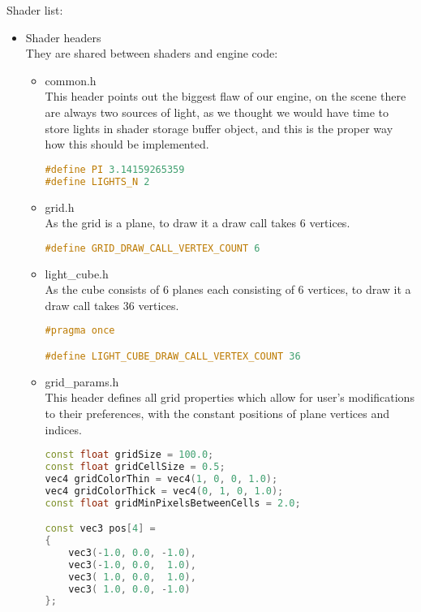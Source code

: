 Shader list:
\begin{itemize}
    \item Shader headers\\
    They are shared between shaders and engine code:
    \begin{itemize}
        \item common.h\\
        This header points out the biggest flaw of our engine, on the scene there are always two sources of light, as we thought we would have time to store lights in shader storage buffer object, and this is the proper way how this should be implemented.
\begin{lstlisting}[language=c++, caption=Common used shader constants (./assets/shaders/common.h)]
#define PI 3.14159265359
#define LIGHTS_N 2
\end{lstlisting}
    \item grid.h\\
    As the grid is a plane, to draw it a draw call takes 6 vertices.
\begin{lstlisting}[language=c++, caption=Grid constant (./assets/shaders/grid.h)]
#define GRID_DRAW_CALL_VERTEX_COUNT 6
\end{lstlisting}
    \item light\_cube.h\\
    As the cube consists of 6 planes each consisting of 6 vertices, to draw it a draw call takes 36 vertices.
\begin{lstlisting}[language=c++, caption=Light cubes shader constant (./assets/shaders/light\_cube.h)]
#pragma once

#define LIGHT_CUBE_DRAW_CALL_VERTEX_COUNT 36
\end{lstlisting}
    \item grid\_params.h\\
    This header defines all grid properties which allow for user's modifications to their preferences, with the constant positions of plane vertices and indices.
\begin{lstlisting}[language=c++, caption=Grid shader parameters (./assets/shaders/grid\_params.h)]
const float gridSize = 100.0;
const float gridCellSize = 0.5;
vec4 gridColorThin = vec4(1, 0, 0, 1.0);
vec4 gridColorThick = vec4(0, 1, 0, 1.0);
const float gridMinPixelsBetweenCells = 2.0;

const vec3 pos[4] =
{
    vec3(-1.0, 0.0, -1.0),
    vec3(-1.0, 0.0,  1.0),
    vec3( 1.0, 0.0,  1.0),
    vec3( 1.0, 0.0, -1.0)
};


\end{lstlisting}
\end{itemize}
\end{itemize}
